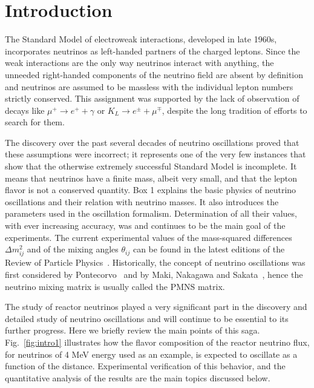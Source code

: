 \section{Introduction} 
\label{sec:intro}

The Standard Model of electroweak interactions,
developed in late 1960s, incorporates neutrinos as left-handed partners of the charged leptons. Since the weak interactions are the
only way neutrinos interact with anything, the unneeded right-handed components of the neutrino field are absent 
by definition and neutrinos are assumed to be massless with the individual lepton numbers strictly conserved.
This assignment was supported by the lack of observation of decays like 
$\mu^+ \rightarrow e^+ + \gamma$ or $K_L \rightarrow e^{\pm} + \mu^{\mp}$,
despite the long tradition of efforts to search for them.

The discovery over the past several decades
of neutrino oscillations proved that these assumptions were incorrect; it
represents one of the very few instances that show that the otherwise
extremely successful Standard Model is incomplete. It means that
neutrinos have a finite mass, albeit very small, and that the lepton flavor is not a conserved quantity.
Box 1 explains the basic physics of neutrino oscillations and their relation with neutrino masses. It
also introduces the parameters used in the oscillation formalism. Determination of all their values,
with ever increasing accuracy,
was and continues to be the main goal of the experiments.
The current experimental values of the mass-squared differences $\Delta m^2_{ij}$ and of the mixing angles $\theta_{ij}$ can be found
in the latest editions of the Review of Particle Physics~\cite{PDG14}.
Historically, the concept of neutrino oscillations was first considered by Pontecorvo~\cite{Pontecorvo57, Pontecorvo58}
and by Maki, Nakagawa and Sakata~\cite{MNS62}, hence the neutrino mixing matrix is usually called the PMNS matrix.

The study of reactor neutrinos played a very significant part in the discovery and detailed study of neutrino oscillations and will continue 
to be essential to its further progress. Here we briefly review
the main points of this saga. Fig.~\ref{fig:intro1} illustrates how the flavor composition of the reactor neutrino flux, for neutrinos of 4 MeV energy
used as an example, is expected to oscillate as a function of the distance. Experimental verification of this behavior, and the quantitative analysis of the
results are the main topics discussed below.

